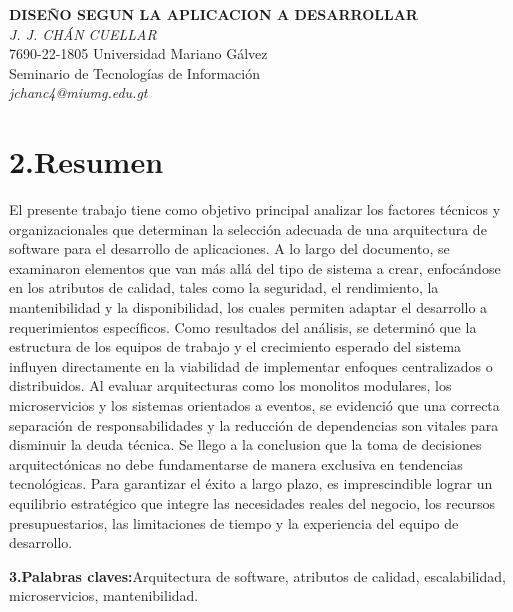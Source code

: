 \documentclass[12pt,letterpaper]{article}
\begin{document}
\begin{center}
    {\large\textbf{DISEÑO SEGUN LA APLICACION A DESARROLLAR}} \\[1.5ex]
    \textit{J. J. CHÁN CUELLAR } \\[1.5ex]
    7690-22-1805 \quad Universidad Mariano Gálvez \\[1.0ex]
    Seminario de Tecnologías de Información \\[1.0ex]
    \textit{jchanc4@miumg.edu.gt}
\end{center}
\vspace{1em}
\section*{2.Resumen}
El presente trabajo tiene como objetivo principal analizar los factores técnicos y organizacionales que determinan la selección adecuada de una arquitectura de software para el desarrollo de aplicaciones. A lo largo del documento, se examinaron elementos que van más allá del tipo de sistema a crear, enfocándose en los atributos de calidad, tales como la seguridad, el rendimiento, la mantenibilidad y la disponibilidad, los cuales permiten adaptar el desarrollo a requerimientos específicos. Como resultados del análisis, se determinó que la estructura de los equipos de trabajo y el crecimiento esperado del sistema influyen directamente en la viabilidad de implementar enfoques centralizados o distribuidos. Al evaluar arquitecturas como los monolitos modulares, los microservicios y los sistemas orientados a eventos, se evidenció que una correcta separación de responsabilidades y la reducción de dependencias son vitales para disminuir la deuda técnica. Se llego a la conclusion que la toma de decisiones arquitectónicas no debe fundamentarse de manera exclusiva en tendencias tecnológicas. Para garantizar el éxito a largo plazo, es imprescindible lograr un equilibrio estratégico que integre las necesidades reales del negocio, los recursos presupuestarios, las limitaciones de tiempo y la experiencia del equipo de desarrollo.


\vspace{1em}

\noindent\textbf{3.Palabras claves:}Arquitectura de software, atributos de calidad, escalabilidad, microservicios, mantenibilidad.
\vspace{1em}
\end{document}
